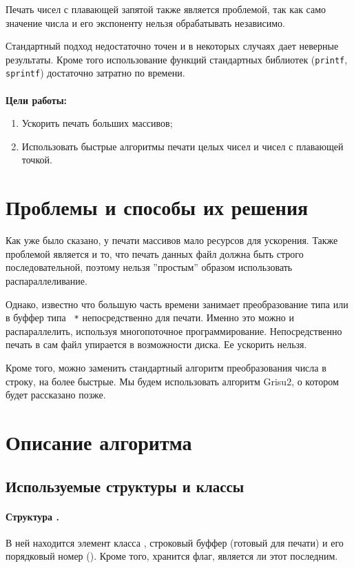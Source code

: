\documentclass[a4paper, 12pt, twoside]{article}
\begin{document}
Печать чисел с плавающей запятой также является проблемой, так как само значение числа и его экспоненту нельзя обрабатывать независимо. 

Стандартный подход недостаточно точен и в некоторых случаях дает неверные результаты. 
Кроме того использование функций стандартных библиотек (\texttt{printf}, \texttt{sprintf}) достаточно затратно по времени.
\\
\\
\textbf{Цели работы:}
\begin{enumerate}
\item Ускорить печать больших массивов;
\item Использовать быстрые алгоритмы печати целых чисел и чисел с плавающей точкой.
\end{enumerate}

\section{Проблемы и способы их решения}
Как уже было сказано, у печати массивов мало ресурсов для ускорения.
Также проблемой является и то, что печать данных файл должна быть строго последовательной, поэтому нельзя ''простым'' образом использовать распараллеливание.

Однако, известно что большую часть времени занимает преобразование типа \texttt{} или \texttt{} в буффер типа \texttt{ *} непосредственно для печати.
Именно это можно и распараллелить, используя многопоточное программирование.
Непосредственно печать в сам файл упирается в возможности диска. 
Ее ускорить нельзя.

Кроме того, можно заменить стандартный алгоритм преобразования числа в строку, на более быстрые.
Мы будем использовать алгоритм \textsf{Grisu2}, о котором будет рассказано позже.


\section{Описание алгоритма}

\subsection{Используемые структуры и классы}
\paragraph{Структура \texttt{}.}
В ней находится элемент класса \texttt{}, строковый буффер (готовый для печати) и его порядковый номер (\texttt{}).
Кроме того, хранится флаг, является ли этот \texttt{} последним.
\end{document}
